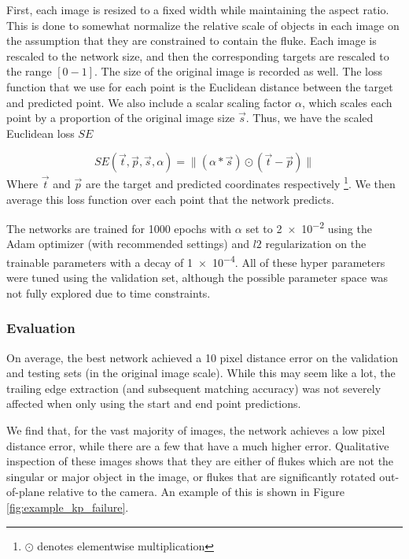 First, each image is resized to a fixed width while maintaining the aspect ratio.
This is done to somewhat normalize the relative scale of objects in each image on the assumption that they are constrained to contain the fluke.
Each image is rescaled to the network size, and then the corresponding targets are rescaled to the range $[0-1]$.
The size of the original image is recorded as well.
The loss function that we use for each point is the Euclidean distance between the target and predicted point.
We also include a scalar scaling factor $\alpha$, which scales each point by a proportion of the original image size $\vec{s}$.
Thus, we have the scaled Euclidean loss $SE$

\begin{equation} \label{eqn:se_loss}
SE(\vec{t}, \vec{p}, \vec{s}, \alpha) = \lVert (\alpha * \vec{s}) \odot (\vec{t} - \vec{p}) \rVert
\end{equation} 
Where $\vec{t}$ and $\vec{p}$ are the target and predicted coordinates respectively \footnote{$\odot$ denotes elementwise multiplication}.
We then average this loss function over each point that the network predicts.

The networks are trained for 1000 epochs with $\alpha$ set to \num{2e-2} using the Adam \cite{kingma2014adam} optimizer (with recommended settings) and $l2$ regularization on the trainable parameters with a decay of \num{1e-4}.
All of these hyper parameters were tuned using the validation set, although the possible parameter space was not fully explored due to time constraints.

\subsubsection{Evaluation} %


On average, the best network achieved a 10 pixel distance error on the validation and testing sets (in the original image scale).
While this may seem like a lot, the trailing edge extraction (and subsequent matching accuracy) was not severely affected when only using the start and end point predictions.

We find that, for the vast majority of images, the network achieves a low pixel distance error, while there are a few that have a much higher error.
Qualitative inspection of these images shows that they are either of flukes which are not the singular or major object in the image, or flukes that are significantly rotated out-of-plane relative to the camera.
An example of this is shown in Figure \ref{fig:example_kp_failure}.

